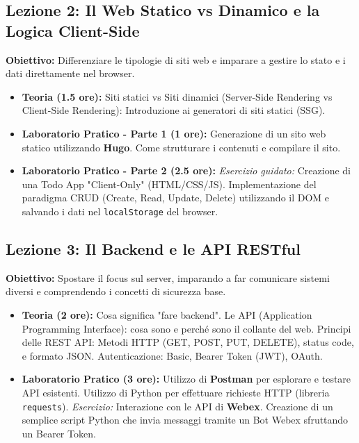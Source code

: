 \documentclass[11pt,a4paper]{article}
\begin{document}
\subsection*{Lezione 2: Il Web Statico vs Dinamico e la Logica Client-Side}
\textbf{Obiettivo:} Differenziare le tipologie di siti web e imparare a gestire lo stato e i dati direttamente nel browser.
\begin{itemize}
    \item \textbf{Teoria (1.5 ore):} Siti statici vs Siti dinamici (Server-Side Rendering vs Client-Side Rendering): Introduzione ai generatori di siti statici (SSG).
    \item \textbf{Laboratorio Pratico - Parte 1 (1 ore):} Generazione di un sito web statico utilizzando \textbf{Hugo}. Come strutturare i contenuti e compilare il sito.
    \item \textbf{Laboratorio Pratico - Parte 2 (2.5 ore):} \textit{Esercizio guidato:} Creazione di una Todo App "Client-Only" (HTML/CSS/JS). Implementazione del paradigma CRUD (Create, Read, Update, Delete) utilizzando il DOM e salvando i dati nel \texttt{localStorage} del browser.
\end{itemize}

\subsection*{Lezione 3: Il Backend e le API RESTful}
\textbf{Obiettivo:} Spostare il focus sul server, imparando a far comunicare sistemi diversi e comprendendo i concetti di sicurezza base.
\begin{itemize}
    \item \textbf{Teoria (2 ore):} Cosa significa "fare backend". Le API (Application Programming Interface): cosa sono e perché sono il collante del web. Principi delle REST API: Metodi HTTP (GET, POST, PUT, DELETE), status code, e formato JSON. Autenticazione: Basic, Bearer Token (JWT), OAuth.
    \item \textbf{Laboratorio Pratico (3 ore):} Utilizzo di \textbf{Postman} per esplorare e testare API esistenti. Utilizzo di Python per effettuare richieste HTTP (libreria \texttt{requests}). \textit{Esercizio:} Interazione con le API di \textbf{Webex}. Creazione di un semplice script Python che invia messaggi tramite un Bot Webex sfruttando un Bearer Token.
\end{itemize}
\end{document}
